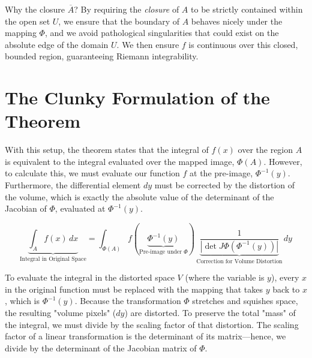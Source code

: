 \begin{didactic_insight}
Why the closure $\overline{A}$? By requiring the \textit{closure} of $A$ to be strictly contained within the open set $U$, we ensure that the boundary of $A$ behaves nicely under the mapping $\Phi$, and we avoid pathological singularities that could exist on the absolute edge of the domain $U$. We then ensure $f$ is continuous over this closed, bounded region, guaranteeing Riemann integrability.
\end{didactic_insight}
\section{The Clunky Formulation of the Theorem}

\begin{spoken_clean}[00:02:45 - 00:03:50]
With this setup, the theorem states that the integral of $f(x)$ over the region $A$ is equivalent to the integral evaluated over the mapped image, $\Phi(A)$. However, to calculate this, we must evaluate our function $f$ at the pre-image, $\Phi^{-1}(y)$. Furthermore, the differential element $dy$ must be corrected by the distortion of the volume, which is exactly the absolute value of the determinant of the Jacobian of $\Phi$, evaluated at $\Phi^{-1}(y)$.
\end{spoken_clean}

\begin{math_stroke}
\begin{equation} \label{eq:cov_clunky}
\underbrace{\int_A f(x) \, dx}_{\text{Integral in Original Space}} = \int_{\Phi(A)} f(\underbrace{\Phi^{-1}(y)}_{\text{Pre-image under }\Phi}) \, \underbrace{\frac{1}{|\det J\Phi(\Phi^{-1}(y))|}}_{\text{Correction for Volume Distortion}} \, dy
\end{equation}

\begin{explanation-of-steps}
To evaluate the integral in the distorted space $V$ (where the variable is $y$), every $x$ in the original function must be replaced with the mapping that takes $y$ back to $x$, which is $\Phi^{-1}(y)$. Because the transformation $\Phi$ stretches and squishes space, the resulting "volume pixels" ($dy$) are distorted. To preserve the total "mass" of the integral, we must divide by the scaling factor of that distortion. The scaling factor of a linear transformation is the determinant of its matrix—hence, we divide by the determinant of the Jacobian matrix of $\Phi$.
\end{explanation-of-steps}
\end{math_stroke}

